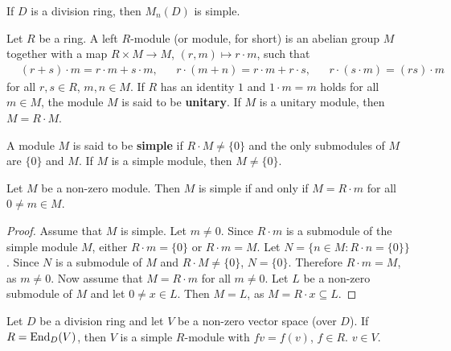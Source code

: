 \begin{example}
	If $D$ is a division ring, then $M_n(D)$ is simple. 
\end{example}

Let $R$ be a ring. A left $R$-module (or module, for short)  
is an abelian group $M$ together with a map $R\times M\to M$, $(r,m)\mapsto r\cdot m$, such that
\begin{align*}
	&(r+s)\cdot m=r\cdot m+s\cdot m, &&
	r\cdot (m+n)=r\cdot m+r\cdot s, && r\cdot (s\cdot m)=(rs)\cdot m    
\end{align*}
for all $r,s\in R$, $m,n\in M$.  If $R$ has an identity 
$1$ and $1\cdot m=m$ holds for all $m\in M$, the module $M$ is said to be 
\textbf{unitary}.  If $M$ is a unitary module, then $M=R\cdot M$. %

\begin{definition}
A module $M$ is said to be 
\textbf{simple} if $R\cdot M\ne\{0\}$ and the only submodules of $M$ are $\{0\}$ and $M$.
If $M$ is a simple module, then $M\ne\{0\}$.
\end{definition}


\begin{lemma}
	\label{lemma:simple}
	Let $M$ be a non-zero module. Then $M$ is simple if and only if $M=R\cdot m$
	for all $0\ne m\in M$.
\end{lemma}

\begin{proof}
	Assume that $M$ is simple.  Let $m\ne 0$. Since $R\cdot m$ is a submodule of the simple 
	module $M$, either $R\cdot m=\{0\}$ or $R\cdot m=M$.  Let $N=\{n\in M:R\cdot n=\{0\}\}$. Since $N$ is a 
	submodule of $M$ and $R\cdot M\ne\{0\}$, $N=\{0\}$. Therefore $R\cdot m=M$, as $m\ne0$.
	Now assume that $M=R\cdot m$ for all $m\ne0$. Let $L$ be a non-zero submodule of 
	$M$ and let $0\ne x\in L$. Then $M=L$, as $M=R\cdot x\subseteq L$. 
\end{proof} 

\begin{example}
	Let $D$ be a division ring and let $V$ be a non-zero vector space (over $D$). If 
	$R=\operatorname{End}_D(V)$, then $V$ is a simple $R$-module with $fv=f(v)$, $f\in R$.
	$v\in V$. 
\end{example}

